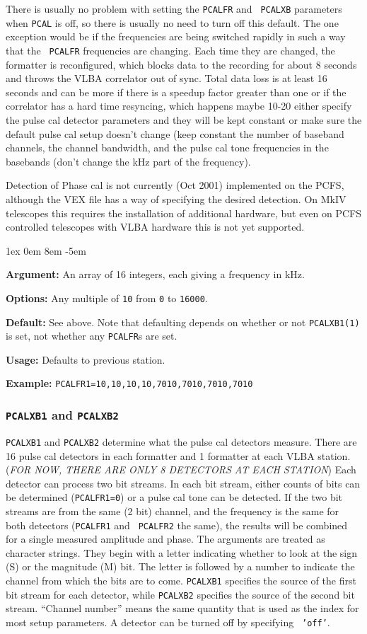 \documentclass{report}
\newcommand{\rcwbox}[5]{
  \begin{list}{}{\parsep 1ex  \itemsep 0em
                 \leftmargin 8em  \itemindent -5em }
    \item {\bf Argument:} #1
    \item {\bf Options:}  #2
    \item {\bf Default:}  #3
    \item {\bf Usage:}    #4
    \item {\bf Example:}  #5
  \end{list}
}
\begin{document}
There is usually no problem with setting the {\tt PCALFR} and {\tt
PCALXB} parameters when {\tt PCAL} is off, so there is usually no need
to turn off this default. The one exception would be if the
frequencies are being switched rapidly in such a way that the {\tt
PCALFR} frequencies are changing. Each time they are changed, the
formatter is reconfigured, which blocks data to the recording for
about 8 seconds and throws the VLBA correlator out of sync.  Total
data loss is at least 16 seconds and can be more if there is a speedup
factor greater than one or if the correlator has a hard time
resyncing, which happens maybe 10-20%
either specify the pulse cal detector parameters and they will be kept
constant or make sure the default pulse cal setup doesn't change (keep
constant the number of baseband channels, the channel bandwidth, and
the pulse cal tone frequencies in the basebands (don't change the kHz
part of the frequency).

Detection of Phase cal is not currently (Oct 2001) implemented on the
PCFS, although the VEX file has a way of specifying the desired
detection.  On MkIV telescopes this requires the installation of
additional hardware, but even on PCFS controlled telescopes with VLBA
hardware this is not yet supported.

\rcwbox
{An array of 16 integers, each giving a frequency in kHz.}
{Any multiple of {\tt 10} from {\tt 0} to {\tt 16000}.}
{See above. Note that defaulting depends on whether or not {\tt PCALXB1(1)}
is set, not whether any {\tt PCALFR}s are set.}
{Defaults to previous station.}
{{\tt PCALFR1=10,10,10,10,7010,7010,7010,7010}}



\subsubsection{\label{SP:PCALXB1}{\tt PCALXB1} and {\tt PCALXB2}}

{\tt PCALXB1} and {\tt PCALXB2} determine what the pulse cal detectors
measure. There are 16 pulse cal detectors in each formatter and 1
formatter at each VLBA station. ({\em FOR NOW, THERE ARE ONLY 8
DETECTORS AT EACH STATION}) Each detector can process two bit
streams. In each bit stream, either counts of bits can be determined
({\tt PCALFR1=0}) or a pulse cal tone can be detected. If the two bit
streams are from the same (2 bit) channel, and
the frequency is the same for both detectors ({\tt PCALFR1} and {\tt
PCALFR2} the same), the results will be combined for a single measured
amplitude and phase. The arguments are treated as character
strings. They begin with a letter indicating whether to look at the
sign (S) or the magnitude (M) bit. The letter is followed by a number
to indicate the channel from which the bits are to come. {\tt PCALXB1}
specifies the source of the first bit stream for each detector, while
{\tt PCALXB2} specifies the source of the second bit stream. ``Channel
number'' means the same quantity that is used as the index for most
setup parameters. A detector can be turned off by specifying {\tt
'off'}.
\end{document}
